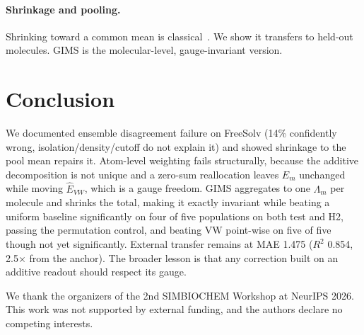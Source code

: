 \documentclass{article}
\begin{document}
\paragraph{Shrinkage and pooling.} Shrinking toward a common mean is classical~\cite{efron1977}. We show it transfers to held-out molecules. GIMS is the molecular-level, gauge-invariant version.

\section{Conclusion}

We documented ensemble disagreement failure on FreeSolv (14\% confidently wrong,
isolation/density/cutoff do not explain it) and showed shrinkage to the pool mean
repairs it.
Atom-level weighting fails structurally, because the additive decomposition is
not unique and a zero-sum reallocation leaves $E_m$ unchanged while moving
$\hat E_{VW}$, which is a gauge freedom. GIMS aggregates to one $\Lambda_m$ per
molecule and shrinks the total, making it exactly invariant while beating a
uniform baseline significantly on four of five populations on both test and H2,
passing the permutation control, and beating VW point-wise on five of five
though not yet significantly. External transfer remains at MAE 1.475 ($R^2$
0.854, 2.5$\times$ from the anchor). The broader lesson is that any correction
built on an additive readout should respect its gauge.

\begin{ack}
We thank the organizers of the 2nd SIMBIOCHEM Workshop at NeurIPS 2026. This
work was not supported by external funding, and the authors declare no
competing interests.
\end{ack}
\end{document}
